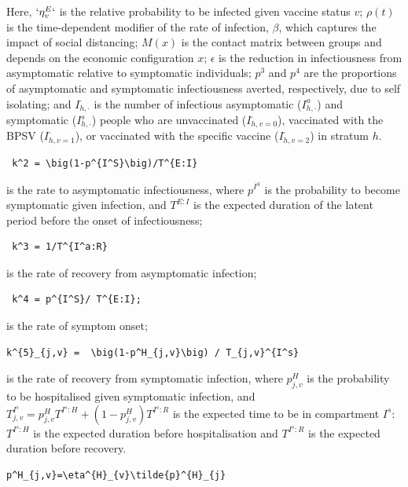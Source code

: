 \documentclass[
]{article}
\begin{document}
Here, \(`\eta^{E}_{v}`\) is the relative probability to be infected given vaccine status \(v\); \(\rho(t)\) is the time-dependent modifier of the rate of infection, \(\beta\), which captures the impact of social distancing; \(M(x)\) is the contact matrix between groups and depends on the economic configuration \(x\); \(\epsilon\) is the reduction in infectiousness from asymptomatic relative to symptomatic individuals; \(p^3\) and \(p^4\) are the proportions of asymptomatic and symptomatic infectiousness averted, respectively, due to self isolating; and \(I_{h,\cdot}^{\cdot}\) is the number of infectious asymptomatic (\(I_{h,\cdot}^{a}\)) and symptomatic (\(I_{h,\cdot}^{s}\)) people who are unvaccinated (\(I_{h,v=0}^{\cdot}\)), vaccinated with the BPSV (\(I_{h,v=1}^{\cdot}\)), or vaccinated with the specific vaccine (\(I_{h,v=2}^{\cdot}\)) in stratum \(h\).

\begin{verbatim}
 k^2 = \big(1-p^{I^S}\big)/T^{E:I} 
\end{verbatim}

is the rate to asymptomatic infectiousness, where \(p^{I^S}\) is the probability to become symptomatic given infection, and \(T^{E:I}\) is the expected duration of the latent period before the onset of infectiousness;

\begin{verbatim}
 k^3 = 1/T^{I^a:R}  
\end{verbatim}

is the rate of recovery from asymptomatic infection;

\begin{verbatim}
 k^4 = p^{I^S}/ T^{E:I}; 
\end{verbatim}

is the rate of symptom onset;

\begin{verbatim}
k^{5}_{j,v} =  \big(1-p^H_{j,v}\big) / T_{j,v}^{I^s}
\end{verbatim}

is the rate of recovery from symptomatic infection, where \(p^H_{j,v}\) is the probability to be hospitalised given symptomatic infection, and \(T_{j,v}^{I^s} = p^H_{j,v}T^{I^s:H} + (1-p^H_{j,v})T^{I^s:R}\) is the expected time to be in compartment \(I^s\): \(T^{I^s:H}\) is the expected duration before hospitalisation and \(T^{I^s:R}\) is the expected duration before recovery.

\begin{verbatim}
p^H_{j,v}=\eta^{H}_{v}\tilde{p}^{H}_{j}
\end{verbatim}
\end{document}
